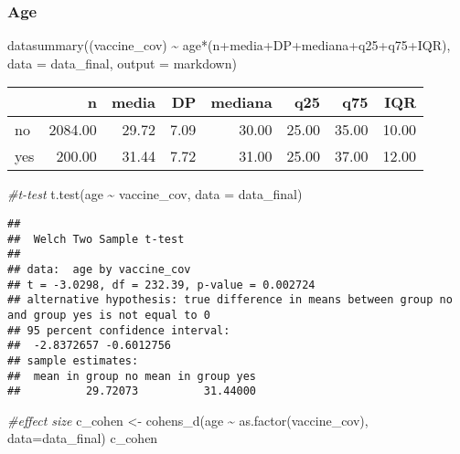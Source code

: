 \documentclass[
]{article}
\newenvironment{Shaded}{\begin{snugshade}}{\end{snugshade}}
\newcommand{\AttributeTok}[1]{\textcolor[rgb]{0.77,0.63,0.00}{#1}}
\newcommand{\CommentTok}[1]{\textcolor[rgb]{0.56,0.35,0.01}{\textit{#1}}}
\newcommand{\FunctionTok}[1]{\textcolor[rgb]{0.00,0.00,0.00}{#1}}
\newcommand{\NormalTok}[1]{#1}
\newcommand{\OtherTok}[1]{\textcolor[rgb]{0.56,0.35,0.01}{#1}}
\newcommand{\SpecialCharTok}[1]{\textcolor[rgb]{0.00,0.00,0.00}{#1}}
\newcommand{\StringTok}[1]{\textcolor[rgb]{0.31,0.60,0.02}{#1}}
\begin{document}
\hypertarget{age}{%
\subsubsection{Age}\label{age}}

\begin{Shaded}
\begin{Highlighting}[]
\FunctionTok{datasummary}\NormalTok{((vaccine\_cov) }\SpecialCharTok{\textasciitilde{}}\NormalTok{ age}\SpecialCharTok{*}\NormalTok{(n}\SpecialCharTok{+}\NormalTok{media}\SpecialCharTok{+}\NormalTok{DP}\SpecialCharTok{+}\NormalTok{mediana}\SpecialCharTok{+}\NormalTok{q25}\SpecialCharTok{+}\NormalTok{q75}\SpecialCharTok{+}\NormalTok{IQR),}
            \AttributeTok{data =}\NormalTok{ data\_final, }\AttributeTok{output =} \StringTok{\textquotesingle{}markdown\textquotesingle{}}\NormalTok{)}
\end{Highlighting}
\end{Shaded}

\begin{longtable}[]{@{}lrrrrrrr@{}}
\toprule
& n & media & DP & mediana & q25 & q75 & IQR \\
\midrule
\endhead
no & 2084.00 & 29.72 & 7.09 & 30.00 & 25.00 & 35.00 & 10.00 \\
yes & 200.00 & 31.44 & 7.72 & 31.00 & 25.00 & 37.00 & 12.00 \\
\bottomrule
\end{longtable}

\begin{Shaded}
\begin{Highlighting}[]
\CommentTok{\#t{-}test}
\FunctionTok{t.test}\NormalTok{(age }\SpecialCharTok{\textasciitilde{}}\NormalTok{ vaccine\_cov, }\AttributeTok{data =}\NormalTok{ data\_final)}
\end{Highlighting}
\end{Shaded}

\begin{verbatim}
## 
##  Welch Two Sample t-test
## 
## data:  age by vaccine_cov
## t = -3.0298, df = 232.39, p-value = 0.002724
## alternative hypothesis: true difference in means between group no and group yes is not equal to 0
## 95 percent confidence interval:
##  -2.8372657 -0.6012756
## sample estimates:
##  mean in group no mean in group yes 
##          29.72073          31.44000
\end{verbatim}

\begin{Shaded}
\begin{Highlighting}[]
\CommentTok{\#effect size}
\NormalTok{c\_cohen }\OtherTok{\textless{}{-}} \FunctionTok{cohens\_d}\NormalTok{(age }\SpecialCharTok{\textasciitilde{}} \FunctionTok{as.factor}\NormalTok{(vaccine\_cov), }\AttributeTok{data=}\NormalTok{data\_final)}
\NormalTok{c\_cohen}
\end{Highlighting}
\end{Shaded}
\end{document}
